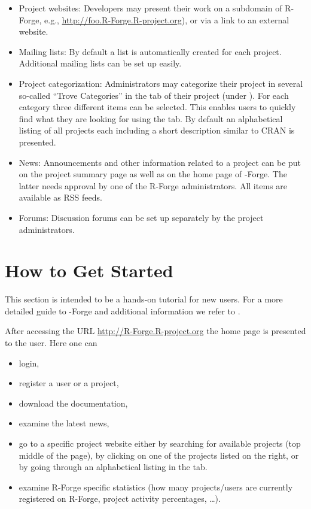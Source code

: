 \begin{itemize}
\item Project websites: Developers may present their work
  on a subdomain of R-Forge, e.g.,
  \url{http://foo.R-Forge.R-project.org}), or via a link to an
  external website.
\item Mailing lists: By default a list
   is automatically
  created for each project. Additional mailing lists can be
  set up easily.
\item Project categorization: Administrators may categorize their
  project in several so-called ``Trove Categories'' in the 
  tab of their project (under ). For each
  category three different items can be selected. This enables users
  to quickly find what they are looking for using the 
  tab. By default an alphabetical listing of all projects each
  including a short description similar to CRAN is presented.
\item News: Announcements and other information related to a project
  can be put on the project summary page as well as on the 
  home page of \R{}-Forge. The latter needs approval by one of the R-Forge
  administrators. All items are available as RSS feeds.
\item Forums: Discussion forums can be set up separately by the
  project administrators.%
\end{itemize}

\section{How to Get Started}
This section is intended to be a hands-on tutorial for new users. For
a more detailed guide to \R{}-Forge and additional 
information we refer to \citet[][subsequently
referred to as user's manual]{forge:usermanual:2008}.

After accessing the URL \url{http://R-Forge.R-project.org} the home
page is presented to the user. Here one can
\begin{itemize}
\item login,
\item register a user or a project,
\item download the documentation,
\item examine the latest news,
\item go to a specific project website either by searching for available
  projects (top middle of the page), by clicking on one of the projects
  listed on the right, or by going through an alphabetical listing in
  the  tab. 
\item examine R-Forge specific statistics (how many projects/users
  are currently registered on R-Forge, project activity percentages,
  \ldots{}).
\end{itemize}

